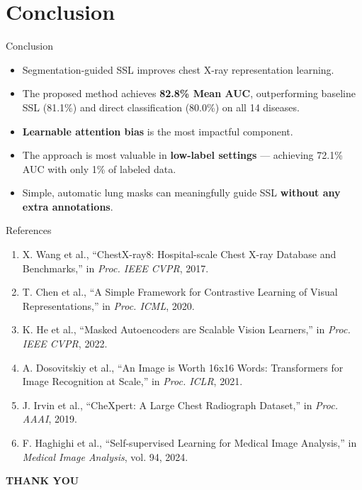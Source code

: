 \documentclass{beamer}
\begin{document}
\section{Conclusion}

\begin{frame}{Conclusion}
\begin{itemize}
    \item Segmentation-guided SSL improves chest X-ray representation learning.
    \vspace{6pt}
    \item The proposed method achieves \textbf{82.8\% Mean AUC}, outperforming baseline SSL (81.1\%) and direct classification (80.0\%) on all 14 diseases.
    \vspace{6pt}
    \item \textbf{Learnable attention bias} is the most impactful component.
    \vspace{6pt}
    \item The approach is most valuable in \textbf{low-label settings} --- achieving 72.1\% AUC with only 1\% of labeled data.
    \vspace{6pt}
    \item Simple, automatic lung masks can meaningfully guide SSL \textbf{without any extra annotations}.
\end{itemize}
\end{frame}


\begin{frame}{References}
\small
\begin{enumerate}
    \item[\textbf{[1]}] X. Wang et al.,
    ``ChestX-ray8: Hospital-scale Chest X-ray Database and Benchmarks,''
    in \textit{Proc. IEEE CVPR}, 2017.

    \item[\textbf{[2]}] T. Chen et al.,
    ``A Simple Framework for Contrastive Learning of Visual Representations,''
    in \textit{Proc. ICML}, 2020.

    \item[\textbf{[3]}] K. He et al.,
    ``Masked Autoencoders are Scalable Vision Learners,''
    in \textit{Proc. IEEE CVPR}, 2022.

    \item[\textbf{[4]}] A. Dosovitskiy et al.,
    ``An Image is Worth 16x16 Words: Transformers for Image Recognition at Scale,''
    in \textit{Proc. ICLR}, 2021.

    \item[\textbf{[5]}] J. Irvin et al.,
    ``CheXpert: A Large Chest Radiograph Dataset,''
    in \textit{Proc. AAAI}, 2019.

    \item[\textbf{[6]}] F. Haghighi et al.,
    ``Self-supervised Learning for Medical Image Analysis,''
    in \textit{Medical Image Analysis}, vol. 94, 2024.
\end{enumerate}
\end{frame}


\begin{frame}
\begin{center}
\Huge \textbf{THANK YOU}
\end{center}
\end{frame}
\end{document}
